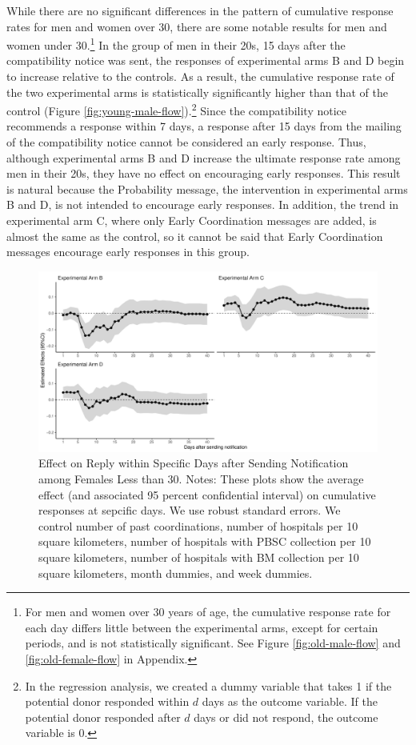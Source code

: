 \documentclass[
]{article}
\begin{document}
While there are no significant differences in the pattern of cumulative response rates for men and women over 30, there are some notable results for men and women under 30.\footnote{For men and women over 30 years of age, the cumulative response rate for each day differs little between the experimental arms, except for certain periods, and is not statistically significant. See Figure \ref{fig:old-male-flow} and \ref{fig:old-female-flow} in Appendix.} In the group of men in their 20s, 15 days after the compatibility notice was sent, the responses of experimental arms B and D begin to increase relative to the controls. As a result, the cumulative response rate of the two experimental arms is statistically significantly higher than that of the control (Figure \ref{fig:young-male-flow}).\footnote{In the regression analysis, we created a dummy variable that takes 1 if the potential donor responded within \(d\) days as the outcome variable. If the potential donor responded after \(d\) days or did not respond, the outcome variable is 0.} Since the compatibility notice recommends a response within 7 days, a response after 15 days from the mailing of the compatibility notice cannot be considered an early response. Thus, although experimental arms B and D increase the ultimate response rate among men in their 20s, they have no effect on encouraging early responses. This result is natural because the Probability message, the intervention in experimental arms B and D, is not intended to encourage early responses. In addition, the trend in experimental arm C, where only Early Coordination messages are added, is almost the same as the control, so it cannot be said that Early Coordination messages encourage early responses in this group.

\begin{figure}[t]
\includegraphics{robustness-body_files/figure-latex/young-female-flow-1} \caption{Effect on Reply within Specific Days after Sending Notification among Females Less than 30. Notes: These plots show the average effect (and associated 95 percent confidential interval) on cumulative responses at sepcific days. We use robust standard errors. We control number of past coordinations, number of hospitals per 10 square kilometers, number of hospitals with PBSC collection per 10 square kilometers, number of hospitals with BM collection per 10 square kilometers, month dummies, and week dummies.}\label{fig:young-female-flow}
\end{figure}
\end{document}
